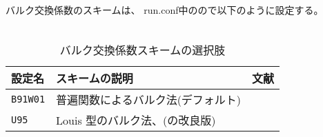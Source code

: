 バルク交換係数のスキームは、
run.conf中のので以下のように設定する。\\

\\

\begin{table}[h]
\begin{center}
  \caption{バルク交換係数スキームの選択肢}
  \label{tab:nml_bulk}
  \begin{tabularx}{150mm}{llX} \hline
    \rowcolor[gray]{0.9}  設定名 & スキームの説明 & 文献 \\ \hline
      \verb|B91W01| & 普遍関数によるバルク法(デフォルト) & \citet{beljaars_1991,wilson_2001} \\
      \verb|U95|    & Louis 型のバルク法、(\citet{louis_1979}の改良版) & \citet{uno_1995} \\
    \hline
  \end{tabularx}
\end{center}
\end{table}
